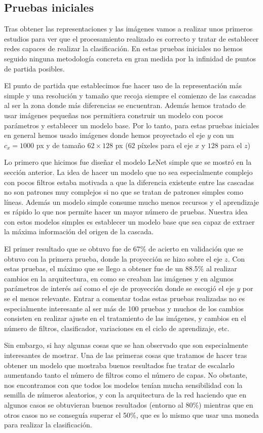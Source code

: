 \documentclass[a4paper,12pt,twoside,titlepage]{article}
\begin{document}
\subsection{Pruebas iniciales}
\label{sec:pruebas_iniciales}
Tras obtener las representaciones y las imágenes vamos a realizar unos primeros estudios para ver que el procesamiento realizado es correcto y tratar de establecer redes capaces de realizar la clasificación. En estas pruebas iniciales no hemos seguido ninguna metodología concreta en gran medida por la infinidad de puntos de partida posibles.

El punto de partida que establecimos fue hacer uso de la representación más simple y una resolución y tamaño que recoja siempre el comienzo de las cascadas al ser la zona donde más diferencias se encuentran. Además hemos tratado de usar imágenes pequeñas nos permitiera construir un modelo con pocos parámetros y establecer un modelo base. Por lo tanto, para estas pruebas iniciales en general hemos usado imágenes donde hemos proyectado el eje $y$ con un $c_x = 1000$ px y de tamaño $62 \times 128$ px ($62$ píxeles para el eje $x$ y $128$ para el $z$)

Lo primero que hicimos fue diseñar el modelo LeNet simple que se mostró en la sección anterior. La idea de hacer un modelo que no sea especialmente complejo con pocos filtros estaba motivada a que la diferencia existente entre las cascadas no son patrones muy complejos si no que se tratan de patrones simples como líneas. Además un modelo simple consume mucho menos recursos y el aprendizaje es rápido lo que nos permite hacer un mayor número de pruebas. Nuestra idea con estos modelos simples es establecer un modelo base que sea capaz de extraer la máxima información del origen de la cascada.

El primer resultado que se obtuvo fue de 67\% de acierto en validación que se obtuvo con la primera prueba, donde la proyección se hizo sobre el eje $z$. Con estas pruebas, el máximo que se llego a obtener fue de un 88.5\% al realizar cambios en la arquitectura, en como se creaban las imágenes y en algunos parámetros de interés así como el eje de proyección donde se escogió el eje $y$ por se el menos relevante. Entrar a comentar todas estas pruebas realizadas no es especialmente interesante al ser más de 100 pruebas y muchos de los cambios consisten en realizar ajuste en el tratamiento de las imágenes, y cambios en el número de filtros, clasificador, variaciones en el ciclo de aprendizaje, etc.

Sin embargo, si hay algunas cosas que se han observado que son especialmente interesantes de mostrar. Una de las primeras cosas que tratamos de hacer tras obtener un modelo que mostraba buenos resultados fue tratar de escalarlo aumentando tanto el número de filtros como el número de capas. No obstante, nos encontramos con que todos los modelos tenían mucha sensibilidad con la semilla de números aleatorios, y con la arquitectura de la red haciendo que en algunos casos se obtuvieran buenos resultados (entorno al $80\%$) mientras que en otros casos no se conseguía superar el 50\%, que es lo mismo que usar una moneda para realizar la clasificación. 
\end{document}
